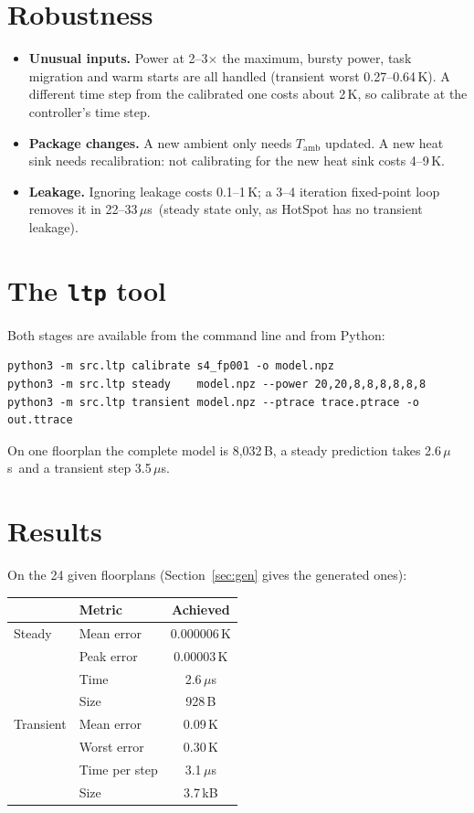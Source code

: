 \documentclass[11pt,a4paper]{article}
\newcommand{\us}{\,$\mu$s}
\begin{document}
\FloatBarrier
\section{Robustness}
\begin{itemize}
  \item \textbf{Unusual inputs.} Power at 2--3$\times$ the maximum, bursty power, task migration
        and warm starts are all handled (transient worst 0.27--0.64\,K). A different time step from
        the calibrated one costs about 2\,K, so calibrate at the controller's time step.
  \item \textbf{Package changes.} A new ambient only needs $T_\text{amb}$ updated. A new heat sink
        needs recalibration: not calibrating for the new heat sink costs 4--9\,K.
  \item \textbf{Leakage.} Ignoring leakage costs 0.1--1\,K; a 3--4 iteration fixed-point loop
        removes it in 22--33\us\ (steady state only, as HotSpot has no transient leakage).
\end{itemize}

\section{The \texttt{ltp} tool}
Both stages are available from the command line and from Python:
{\small\begin{verbatim}
python3 -m src.ltp calibrate s4_fp001 -o model.npz
python3 -m src.ltp steady    model.npz --power 20,20,8,8,8,8,8,8
python3 -m src.ltp transient model.npz --ptrace trace.ptrace -o out.ttrace
\end{verbatim}}
On one floorplan the complete model is 8{,}032\,B, a steady prediction takes 2.6\us\ and a
transient step 3.5\us.

\section{Results}
On the 24 given floorplans (Section~\ref{sec:gen} gives the generated ones):
\begin{center}
\small
\begin{tabular}{@{}l l c@{}}
\toprule
& Metric & Achieved \\
\midrule
Steady & Mean error & 0.000006\,K \\
& Peak error & 0.00003\,K \\
& Time & 2.6\us \\
& Size & 928\,B \\
\midrule
Transient & Mean error & 0.09\,K \\
& Worst error & 0.30\,K \\
& Time per step & 3.1\us \\
& Size & 3.7\,kB \\
\bottomrule
\end{tabular}
\end{center}
\end{document}
